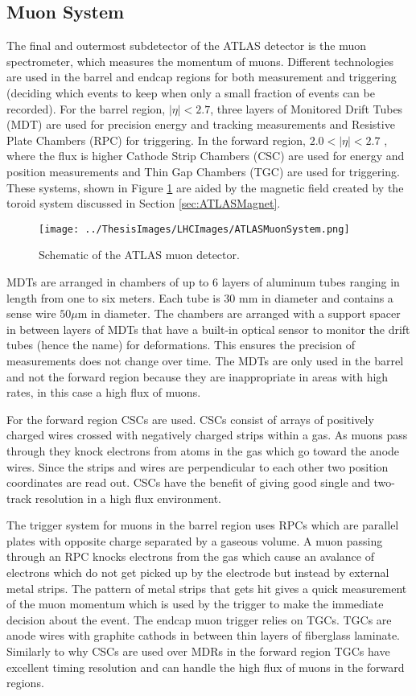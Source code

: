 \subsection{Muon System}
\label{sec:MuCal}
The final and outermost subdetector of the ATLAS detector is the muon spectrometer, which measures the momentum of muons.  Different technologies are used in the barrel and endcap regions for both measurement and triggering (deciding which events to keep when only a small fraction of events can be recorded).  For the barrel region, $|\eta|<2.7$, three layers of Monitored Drift Tubes (MDT) are used for precision energy and tracking measurements and Resistive Plate Chambers (RPC) for triggering.  In the forward region, $2.0<|\eta|<2.7$ , where the flux is higher Cathode Strip Chambers (CSC) are used for energy and position measurements and Thin Gap Chambers (TGC) are used for triggering.  These systems, shown in Figure \ref{fig:ATLASMuonSys} are aided by the magnetic field created by the toroid system discussed in Section \ref{sec:ATLASMagnet}.
\begin{figure}[h!]
	\centering
	\texttt{[image: ../ThesisImages/LHCImages/ATLASMuonSystem.png]}
	\caption[Schematic of the ATLAS muon detector.]{Schematic of the ATLAS muon detector.\cite{ATLAS}
	}
	\label{fig:ATLASMuonSys}
\end{figure}

MDTs are arranged in chambers of up to 6 layers of aluminum tubes ranging in length from one to six meters.  Each tube is 30 mm in diameter and contains a sense wire $50\mu\text{m}$ in diameter.  The chambers are arranged with a support spacer in between layers of MDTs that have a built-in optical sensor to monitor the drift tubes (hence the name) for deformations.  This ensures the precision of measurements does not change over time.  The MDTs are only used in the barrel and not the forward region because they are inappropriate in areas with high rates, in this case a high flux of muons. 

For the forward region CSCs are used.  CSCs consist of arrays of positively charged wires crossed with negatively charged strips within a gas.  As muons pass through they knock electrons from atoms in the gas which go toward the anode wires. Since the strips and wires are perpendicular to each other two position coordinates are read out.  CSCs have the benefit of giving good single and two-track resolution in a high flux environment.

The trigger system for muons in the barrel region uses RPCs which are parallel plates with opposite charge separated by a gaseous volume. A muon passing through an RPC knocks electrons from the gas which cause an avalance of electrons which do not get picked up by the electrode but instead by external metal strips.  The pattern of metal strips that gets hit gives a quick measurement of the muon momentum which is used by the trigger to make the immediate decision about the event.
The endcap muon trigger relies on TGCs.  TGCs are anode wires with graphite cathods in between thin layers of fiberglass laminate.  Similarly to why CSCs are used over MDRs in the forward region TGCs have excellent timing resolution and can handle the high flux of muons in the forward regions.


